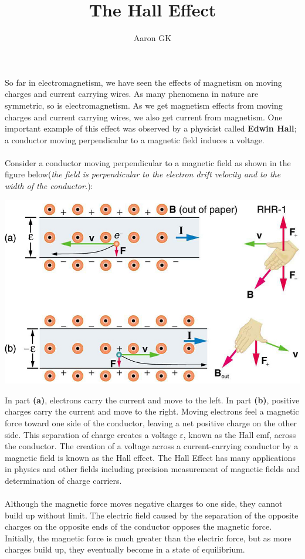 \documentclass[11pt,addpoints]{exam}
\author{Aaron GK}
\begin{document}
			\title{The Hall Effect}
			\maketitle
So far in electromagnetism, we have seen the effects of magnetism on moving charges and current carrying wires. As many phenomena in nature are symmetric, so is electromagnetism. As we get magnetism effects from moving charges and current carrying wires, we also get current from magnetism. One important example of this effect was observed by a physicist called \textbf{Edwin Hall}; a conductor moving perpendicular to a magnetic field induces a voltage.\\ \\
Consider a conductor moving perpendicular to a magnetic field as shown in the figure below(\textit{the field is perpendicular to the electron drift velocity and to the width of the conductor.}):
\begin{center}
	\includegraphics[scale=0.5]{hall_1}
\end{center}
 In part \textbf{(a)}, electrons carry the current and move to the left. In part \textbf{(b)}, positive charges carry the current and move to the right. Moving electrons feel a magnetic force toward one side of the conductor, leaving a net positive charge on the other side. This separation of charge creates a voltage $\varepsilon$, known as the Hall emf, across the conductor. The creation of a voltage across a current-carrying conductor by a magnetic field is known as the Hall effect. The Hall Effect has many applications in physics and other fields including precision measurement of magnetic fields and determination of charge carriers. \\ \\
 Although the magnetic force moves negative charges to one side, they cannot build up without limit. The electric field caused by the separation of the opposite charges on the opposite ends of the conductor opposes the magnetic force. Initially, the magnetic force is much greater than the electric force, but as more charges build up, they eventually become in a state of equilibrium.
\end{document}
